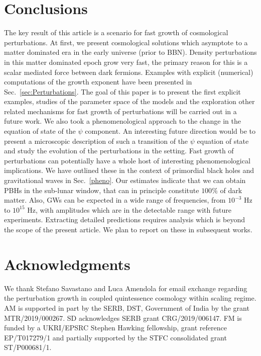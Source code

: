 \documentclass[a4paper, amsfonts, amssymb, amsmath, reprint, showkeys, nofootinbib, twoside, superscriptaddress]{revtex4-1}
\begin{document}
\section{Conclusions}
\label{conclude}

  The key result of this article is a scenario for fast growth of cosmological perturbations. At first, we present cosmological solutions which asymptote  to a matter dominated era in the early universe (prior to BBN). Density perturbations in this
matter dominated epoch grow very fast, the primary reason for this is a scalar mediated force between dark fermions. Examples with explicit (numerical) computations of the growth exponent have been presented in Sec.~\ref{sec:Perturbations}. The goal of this paper is to present the first
explicit examples, studies of the parameter space of the models and the exploration other related mechanisms for fast growth of perturbations will be carried out in a future work. We also took a phenomenological approach to the  change in the equation of state of the $\psi$ component.  An interesting future direction would be to present a microscopic description of such a transition of the $\psi$ equation of state and study the evolution of the perturbations in the setting. Fast growth of perturbations can potentially have a whole host of interesting phenomenological implications. We have outlined these in the context of primordial black holes and gravitational waves in Sec.~\ref{pheno}. Our estimates indicate that we can obtain PBHs in the sub-lunar window, that can in principle constitute $100\%$ of dark matter. Also, GWs can be expected in a wide range of frequencies, from $10^{-3}$ Hz to $10^{15}$ Hz, with amplitudes which are in the detectable range with future experiments. Extracting detailed predictions requires analysis which is beyond the scope of the present article. We plan to report on these in subsequent works.



\section*{Acknowledgments}
We thank Stefano Savastano and Luca Amendola for email exchange regarding the perturbation growth in coupled quintessence cosmology within scaling regime. AM is supported in part by the SERB, DST, Government of India by the grant MTR/2019/000267.  SD acknowledges SERB grant CRG/2019/006147.  FM is funded by a UKRI/EPSRC Stephen
Hawking fellowship, grant reference EP/T017279/1 and
partially supported by the STFC consolidated grant
ST/P000681/1.





\end{document}
